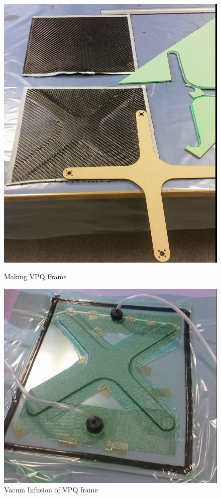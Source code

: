\begin{figure}[H]
        \centering
                \begin{minipage}[b]{0.4\textwidth}
            \includegraphics[width = \textwidth, angle= 0]{VAPIQ-PICTURES/MakingVPQFrame.PNG}
            \caption{Making VPQ Frame}
                    \end{minipage}
                 \hfill
         \begin{minipage}[b]{0,35\textwidth}
            \includegraphics[width =\textwidth, angle =0]{VAPIQ-PICTURES/VacumInfusionVPQFrame.PNG}
              \caption{Vacum Infusion of VPQ frame}
        \end{minipage}


\end{figure}
